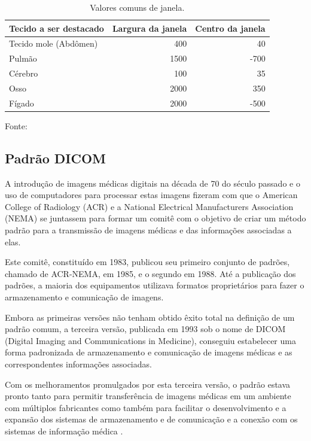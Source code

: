 \begin{table}
 \caption{Valores comuns de janela.}
 \begin{center}
 \begin{tabular}{l|r|r}
 \hline
 	\textbf{Tecido a ser destacado} & \textbf{Largura da janela} & \textbf{Centro da janela} \\ \hline
 	Tecido mole (Abdômen) & 400 & 40 \\
 	Pulmão & 1500 & -700\\
	Cérebro & 100 & 35\\
	Osso & 2000 & 350\\
	Fígado & 2000 & -500\\
 \hline
 \end{tabular}
 \end{center}
 \begin{description}
  \item Fonte: \citealt{common:hu}
 \end{description}
 \label{tab:janela}
\end{table}

\subsection{Padrão DICOM}

A introdução de imagens médicas digitais na década de 70 do século passado e o uso de computadores para processar estas imagens fizeram com que o American College of Radiology (ACR) e a National Electrical Manufacturers Association (NEMA) se juntassem para formar um comitê com o objetivo de criar um método padrão para a transmissão de imagens médicas e das informações associadas a elas.

Este comitê, constituído em 1983, publicou seu primeiro conjunto de padrões, chamado de ACR-NEMA, em 1985, e o segundo em 1988. Até a publicação dos padrões, a maioria dos equipamentos utilizava formatos proprietários para fazer o armazenamento e comunicação de imagens.

Embora as primeiras versões não tenham obtido êxito total na definição de um padrão comum, a terceira versão, publicada em 1993 sob o nome de DICOM (Digital Imaging and Communications in Medicine), conseguiu estabelecer uma forma padronizada de armazenamento e comunicação de imagens médicas e as correspondentes informações associadas.

Com os melhoramentos promulgados por esta terceira versão, o padrão estava pronto tanto para permitir transferência de imagens médicas em um ambiente com múltiplos fabricantes como também para facilitar o desenvolvimento e a expansão dos sistemas de armazenamento e de comunicação e a conexão com os sistemas de informação médica \cite{nema}.

